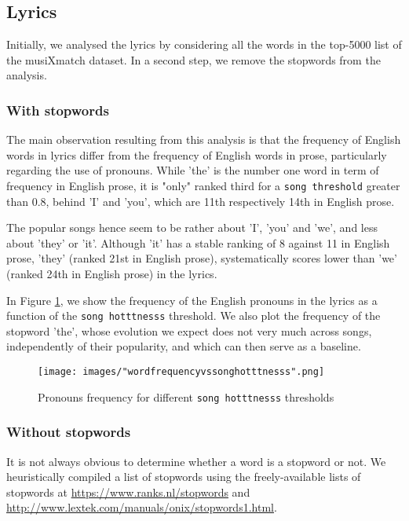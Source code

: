 \documentclass[11pt]{article}
\renewcommand\_{\textunderscore\allowbreak}
\begin{document}

 	
\subsection{Lyrics}
Initially, we analysed the lyrics by considering all the words in the top-5000 list of the musiXmatch dataset. In a second step, we remove the stopwords from the analysis.

\subsubsection{With stopwords}
The main observation resulting from this analysis is that the frequency of English words in lyrics differ from the frequency of English words in prose, particularly regarding the use of pronouns.
While 'the' is the number one word in term of frequency in English prose, it is "only" ranked third for a \texttt{song threshold} greater than 0.8, behind 'I' and 'you', which are 11th respectively 14th in English prose.

The popular songs hence seem to be rather about 'I', 'you' and 'we', and less about 'they' or 'it'.
Although 'it' has a stable ranking of 8 against 11 in English prose, 'they' (ranked 21st in English prose), systematically scores lower than 'we' (ranked 24th in English prose) in the lyrics.

In Figure \ref{fig:word_frequency_stopwords}, we show the frequency of the English pronouns in the lyrics as a function of the \texttt{song hotttnesss} threshold.
We also plot the frequency of the stopword 'the', whose evolution we expect does not very much across songs, independently of their popularity, and which can then serve as a baseline.
\begin{figure}[h!]
\centering
\captionsetup{width=1.0\textwidth}
\texttt{[image: images/"word\_frequency\_vs\_song\_hotttnesss".png]}
\caption{Pronouns frequency for different \texttt{song hotttnesss} thresholds}
\label{fig:word_frequency_stopwords}
\end{figure}

\subsubsection{Without stopwords}
It is not always obvious to determine whether a word is a stopword or not. We heuristically compiled a list of stopwords using the freely-available lists of stopwords at \url{https://www.ranks.nl/stopwords} and \url{http://www.lextek.com/manuals/onix/stopwords1.html}.
\end{document}
